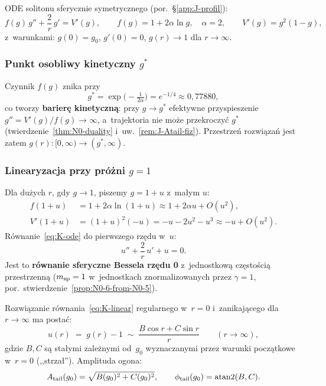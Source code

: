 ODE solitonu sferycznie symetrycznego (por.\ \S\ref{app:J-profil}):
\begin{equation}\label{eq:K-ode}
  f(g)\,g'' + \frac{2}{r}\,g' = V'(g),
  \qquad
  f(g) = 1 + 2\alpha\ln g,\quad \alpha = 2,
  \qquad
  V'(g) = g^2(1-g),
\end{equation}
z~warunkami: $g(0) = g_0$, $g'(0) = 0$, $g(r)\to 1$ dla $r\to\infty$.

\subsubsection{Punkt osobliwy kinetyczny $g^*$}

Czynnik $f(g)$ znika przy
\begin{equation}\label{eq:K-gstar}
  g^* = \exp\!\bigl(-\tfrac{1}{2\alpha}\bigr) = e^{-1/4} \approx 0{,}77880,
\end{equation}
co tworzy \textbf{barierę kinetyczną}: przy $g \to g^*$ efektywne
przyspieszenie $g'' = V'(g)/f(g) \to \infty$, a~trajektoria nie może
przekroczyć $g^*$ (twierdzenie~\ref{thm:N0-duality} i~uw.~\ref{rem:J-Atail-fiz}).
Przestrzeń rozwiązań jest zatem $g(r)\colon [0,\infty)\to (g^*,\infty)$.

\subsubsection{Linearyzacja przy próżni $g = 1$}

Dla dużych $r$, gdy $g\to 1$, piszemy $g = 1 + u$ z~małym $u$:
\begin{align}
  f(1+u) &= 1 + 2\alpha\ln(1+u) \approx 1 + 2\alpha u + O(u^2), \\
  V'(1+u) &= (1+u)^2(-u) = -u - 2u^2 - u^3 \approx -u + O(u^2).
\end{align}
Równanie~\eqref{eq:K-ode} do pierwszego rzędu w~$u$:
\begin{equation}\label{eq:K-linear}
  u'' + \frac{2}{r}\,u' + u = 0.
\end{equation}
Jest to \textbf{równanie sferyczne Bessela rzędu 0} z~jednostkową
częstością przestrzenną ($m_{\rm sp} = 1$ w~jednostkach znormalizowanych
przez $\gamma = 1$, por.\ stwierdzenie~\ref{prop:N0-6-from-N0-5}).

\begin{proposition}\label{prop:K-tail-form}\label{def:A-tail}
Rozwiązanie r\'ownania~\eqref{eq:K-linear} regularnego w~$r=0$
i~zanikającego dla $r\to\infty$ ma postać:
\begin{equation}\label{eq:K-tail}
  u(r) \;=\; g(r) - 1
  \;\sim\; \frac{B\cos r + C\sin r}{r}
  \qquad (r \to \infty),
\end{equation}
gdzie $B,C$ s\k{a} sta\l{}ymi zale\.znymi od~$g_0$ wyznaczanymi
przez warunki pocz\k{a}tkowe w~$r=0$ (,,strzał'').
Amplituda ogona:
\begin{equation}\label{eq:K-Atail}
  A_{\rm tail}(g_0) = \sqrt{B(g_0)^2 + C(g_0)^2}, \qquad
  \phi_{\rm tail}(g_0) = \mathrm{atan2}(B,C).
\end{equation}
\end{proposition}


